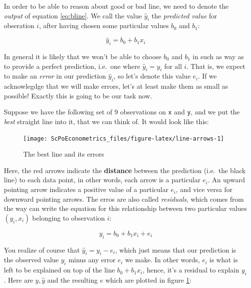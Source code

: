 \documentclass[]{book}
\begin{document}
In order to be able to reason about good or bad line, we need to denote
the \emph{output} of equation \eqref{eq:bline}. We call the value
\(\hat{y}_i\) the \emph{predicted value} for obseration \(i\), after
having chosen some particular values \(b_0\) and \(b_1\):

\begin{equation}
\hat{y}_i = b_0 + b_1 x_i \label{eq:abline-pred}
\end{equation}

In general it is likely that we won't be able to choose \(b_0\) and
\(b_1\) in such as way as to provide a perfect prediction, i.e.~one
where \(\hat{y}_i = y_i\) for all \(i\). That is, we expect to make an
\emph{error} in our prediction \(\hat{y}_i\), so let's denote this value
\(e_i\). If we acknowlegdge that we will make errors, let's at least
make them as small as possible! Exactly this is going to be our task
now.

Suppose we have the following set of 9 observations on \texttt{x} and
\texttt{y}, and we put the \emph{best} straight line into it, that we
can think of. It would look like this:

\begin{figure}

{\centering \texttt{[image: ScPoEconometrics\_files/figure-latex/line-arrows-1]} 

}

\caption{The best line and its errors}\label{fig:line-arrows}
\end{figure}

Here, the red arrows indicate the \textbf{distance} between the
prediction (i.e.~the black line) to each data point, in other words,
each arrow is a particular \(e_i\). An upward pointing arrow indicates a
positive value of a particular \(e_i\), and vice versa for downward
pointing arrows. The erros are also called \emph{residuals}, which comes
from the way can write the equation for this relationship between two
particular values \((y_i,x_i)\) belonging to observation \(i\):

\begin{equation}
y_i = b_0 + b_1 x_i + e_i \label{eq:abline}
\end{equation}

You realize of course that \(\hat{y}_i = y_i - e_i\), which just means
that our prediction is the observed value \(y_i\) minus any error
\(e_i\) we make. In other words, \(e_i\) is what is left to be explained
on top of the line \(b_0 + b_1 x_i\), hence, it's a residual to explain
\(y_i\). Here are \(y,\hat{y}\) and the resulting \(e\) which are
plotted in figure \ref{fig:line-arrows}:
\end{document}
